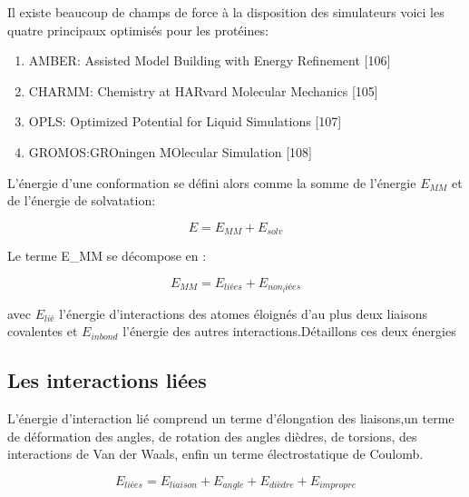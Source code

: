 Il existe beaucoup de champs de force à la disposition des simulateurs voici les quatre principaux optimisés pour les protéines:

\begin{enumerate}
\item AMBER: Assisted Model Building with Energy Refinement [106]
\item CHARMM: Chemistry at HARvard Molecular Mechanics [105]
\item OPLS: Optimized Potential for Liquid Simulations [107]
\item GROMOS:GROningen MOlecular Simulation [108]
\end{enumerate}

L'énergie d'une conformation se défini alors comme la somme de l'énergie $E_{MM}$  et de l'énergie de solvatation:

\begin{equation}
  E = E_{MM} + E_{solv}
\end{equation}

Le terme E_{MM} se décompose en :

\begin{equation}
  E_{MM} = E_{liées} + E_{non_liées}
\end{equation}

avec $E_{lié}$ l'énergie d'interactions des atomes éloignés d'au plus deux liaisons covalentes et $E_{inbond}$  l'énergie des autres interactions.Détaillons ces deux énergies

\subsection{Les interactions liées }

L'énergie d'interaction lié comprend un terme d'élongation des liaisons,un terme de déformation des angles, de rotation des angles dièdres, de torsions, des interactions de Van der Waals, enfin un terme électrostatique de Coulomb.


\begin{equation}
  E_{liées} = E_{liaison} + E_{angle} +E_{dièdre} + E_{impropre}
\end{equation}


